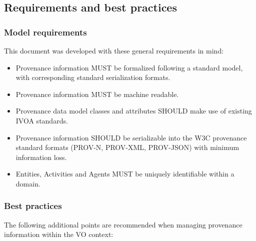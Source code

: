 \subsection{Requirements and best practices}
\label{sec:requirements}

\subsubsection{Model requirements}

This document was developed with these general requirements in mind:

\begin{itemize}


\item Provenance information MUST be formalized following a standard model, with corresponding standard serialization formats.

\item Provenance information MUST be machine readable.

\item Provenance data model classes and attributes SHOULD make use of existing IVOA standards.

\item Provenance information SHOULD be serializable into the W3C provenance standard formats (PROV-N, PROV-XML, PROV-JSON) with minimum information loss.

\item Entities, Activities and Agents MUST be uniquely identifiable within a domain.
\end{itemize}


\subsubsection{Best practices}

The following additional points are recommended when managing provenance information within the VO context:

